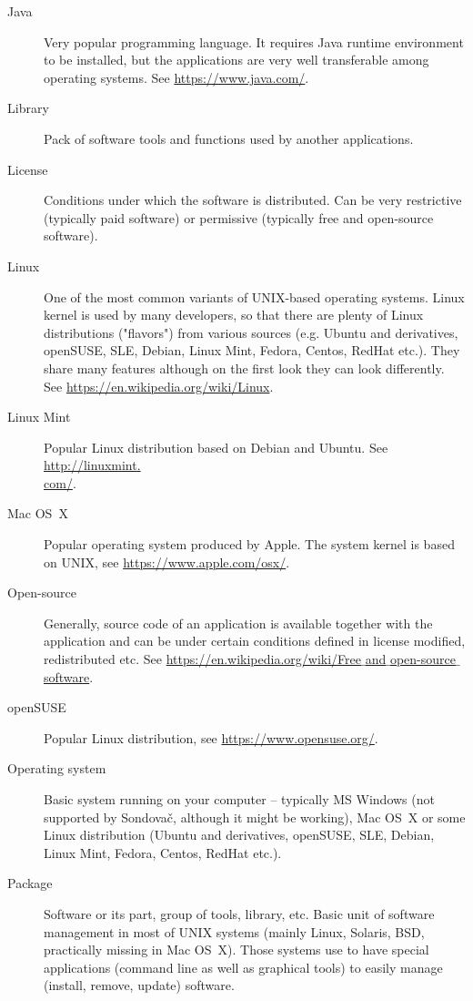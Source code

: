 \documentclass[a4paper, 11pt, twoside]{article}
\begin{document}
\begin{description}
  \item[Java] Very popular programming language. It requires Java runtime environment to be installed, but the applications are very well transferable among operating systems. See \href{https://www.java.com/}{https://www.java.com/}.
  \item[Library] Pack of software tools and functions used by another applications.
  \item[License] Conditions under which the software is distributed. Can be very restrictive (typically paid software) or permissive (typically free and open-source software).
  \item[Linux] One of the most common variants of UNIX-based operating systems. Linux kernel is used by many developers, so that there are plenty of Linux distributions ("flavors") from various sources (e.g. Ubuntu and derivatives, openSUSE, SLE, Debian, Linux Mint, Fedora, Centos, RedHat etc.). They share many features although on the first look they can look differently. See \href{https://en.wikipedia.org/wiki/Linux}{https://en.wikipedia.org/wiki/Linux}.
  \item[Linux Mint] Popular Linux distribution based on Debian and Ubuntu. See \href{http://linuxmint.com/}{http://linuxmint.\\com/}.
  \item[Mac OS~X] Popular operating system produced by Apple. The system kernel is based on UNIX, see \href{https://www.apple.com/osx/}{https://www.apple.com/osx/}.
  \item[Open-source] Generally, source code of an application is available together with the application and can be under certain conditions defined in license modified, redistributed etc. See \href{https://en.wikipedia.org/wiki/Free_and_open-source_software}{https://en.wikipedia.org/wiki/Free$\_$and$\_$open-source$\_$software}.
  \item[openSUSE] Popular Linux distribution, see \href{https://www.opensuse.org/}{https://www.opensuse.org/}.
  \item[Operating system] Basic system running on your computer -- typically MS Windows (not supported by Sondovač, although it might be working), Mac OS~X or some Linux distribution (Ubuntu and derivatives, openSUSE, SLE, Debian, Linux Mint, Fedora, Centos, RedHat etc.).
  \item[Package] Software or its part, group of tools, library, etc. Basic unit of software management in most of UNIX systems (mainly Linux, Solaris, BSD, practically missing in Mac OS~X). Those systems use to have special applications (command line as well as graphical tools) to easily manage (install, remove, update) software.

\end{description}
\end{document}
